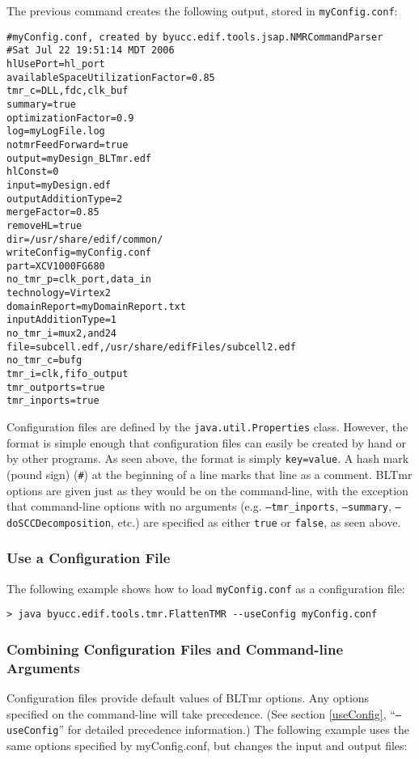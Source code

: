 \documentclass[english]{article}
\begin{document}
The previous command creates the following output, stored in 
\texttt{myConfig.conf}:

\begin{verbatim}
#myConfig.conf, created by byucc.edif.tools.jsap.NMRCommandParser
#Sat Jul 22 19:51:14 MDT 2006
hlUsePort=hl_port
availableSpaceUtilizationFactor=0.85
tmr_c=DLL,fdc,clk_buf
summary=true
optimizationFactor=0.9
log=myLogFile.log
notmrFeedForward=true
output=myDesign_BLTmr.edf
hlConst=0
input=myDesign.edf
outputAdditionType=2
mergeFactor=0.85
removeHL=true
dir=/usr/share/edif/common/
writeConfig=myConfig.conf
part=XCV1000FG680
no_tmr_p=clk_port,data_in
technology=Virtex2
domainReport=myDomainReport.txt
inputAdditionType=1
no_tmr_i=mux2,and24
file=subcell.edf,/usr/share/edifFiles/subcell2.edf
no_tmr_c=bufg
tmr_i=clk,fifo_output
tmr_outports=true
tmr_inports=true
\end{verbatim}

Configuration files are defined by the \texttt{java.util.Properties} class. 
However, the format is simple enough that configuration files can easily be 
created by hand or by other programs. As seen above, the format is simply 
\texttt{key=value}. A hash mark (pound sign) (\texttt{\#}) at the beginning of 
a line marks that line as a comment. BLTmr options are given just as they would 
be on the command-line, with the exception that command-line options with no 
arguments (e.g. \texttt{--tmr\_inports}, \texttt{--summary}, 
\texttt{--doSCCDecomposition}, etc.) are specified as either \texttt{true} or 
\texttt{false}, as seen above.

\subsubsection{Use a Configuration File}

The following example shows how to load \texttt{myConfig.conf} as a configuration
file:

\begin{verbatim}
> java byucc.edif.tools.tmr.FlattenTMR --useConfig myConfig.conf
\end{verbatim}

\subsubsection{Combining Configuration Files and Command-line Arguments}
Configuration files provide default values of BLTmr options. Any options 
specified on the command-line will take precedence. (See section 
\ref{useConfig}, ``\texttt{--useConfig}'' for detailed precedence information.)
The following example uses the same options specified by myConfig.conf, but
changes the input and output files:
\end{document}
